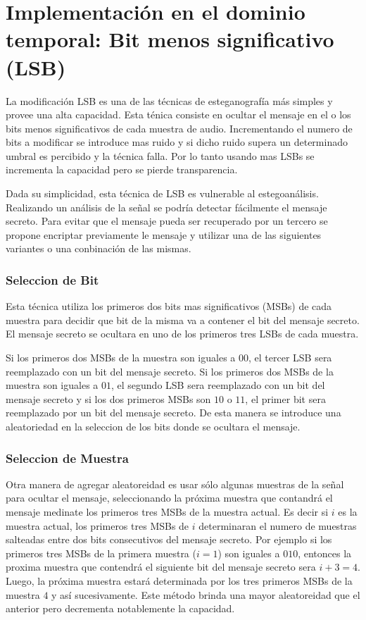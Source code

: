 \documentclass[conference,a4paper,10pt, oneside,final]{tfmpd}
\begin{document}
\section{Implementación en el dominio temporal: Bit menos significativo (LSB)}
La modificación LSB es una de las técnicas de esteganografía más simples y provee una alta capacidad. Esta ténica consiste en ocultar el mensaje en el o los bits menos significativos de cada muestra de audio.
Incrementando el numero de bits a modificar se introduce mas ruido y si dicho ruido supera un determinado umbral es percibido y la técnica falla. Por lo tanto usando mas LSBs se incrementa la capacidad pero se pierde transparencia.

Dada su simplicidad, esta técnica de LSB es vulnerable al estegoanálisis. Realizando un análisis de la señal se podría detectar fácilmente el mensaje secreto. Para evitar que el mensaje pueda ser recuperado por un tercero se propone encriptar previamente le mensaje y utilizar una de las siguientes variantes o una conbinación de las mismas.

\subsubsection{Seleccion de Bit}
Esta técnica utiliza los primeros dos bits mas significativos (MSBs) de cada muestra para decidir que bit de la misma va a contener el bit del mensaje secreto. El mensaje secreto se ocultara en uno de los primeros tres LSBs de cada muestra.

Si los primeros dos MSBs de la muestra son iguales a $00$, el tercer LSB sera reemplazado con un bit del mensaje secreto. Si los primeros dos MSBs de la muestra son iguales a $01$, el segundo LSB sera reemplazado con un bit del mensaje secreto y si los dos primeros MSBs son $10$ o $11$, el primer bit sera reemplazado por un bit del mensaje secreto.
De esta manera se introduce una aleatoriedad en la seleccion de los bits donde se ocultara el mensaje.

\subsubsection{Seleccion de Muestra}
Otra manera de agregar aleatoreidad es usar sólo algunas muestras de la señal para ocultar el mensaje, seleccionando la próxima muestra que contandrá el mensaje medinate los primeros tres MSBs de la muestra actual. Es decir si $i$ es la muestra actual, los primeros tres MSBs de $i$ determinaran el numero de muestras salteadas entre dos bits consecutivos del mensaje secreto. Por ejemplo si los primeros tres MSBs de la primera muestra ($i=1$) son iguales a $010$, entonces la proxima muestra que contendrá el siguiente bit del mensaje secreto sera $i+3=4$. Luego, la próxima muestra estará determinada por los tres primeros MSBs de la muestra $4$ y así sucesivamente. Este método brinda una mayor aleatoreidad que el anterior pero decrementa notablemente la capacidad.
\end{document}
